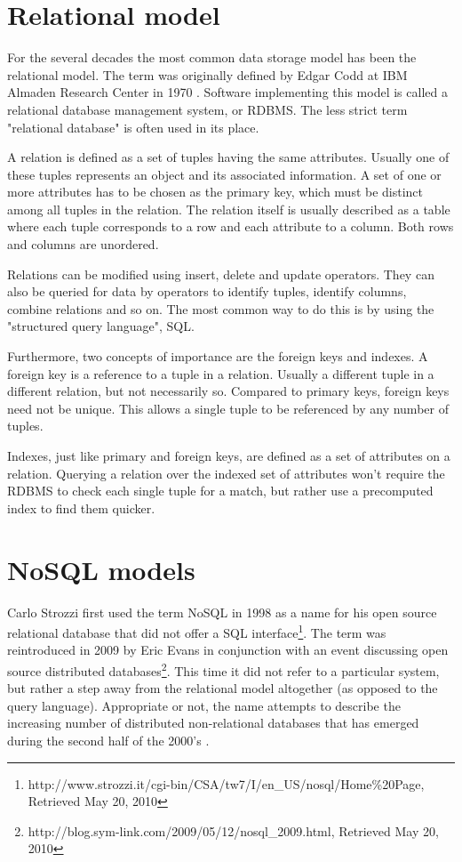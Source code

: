 \section{Relational model} \label{subsec:Relational models}

For the several decades the most common data storage model has been the relational model. The term was originally defined by Edgar Codd at IBM Almaden Research Center in 1970 \cite{Codd}. Software implementing this model is called a relational database management system, or RDBMS. The less strict term "relational database" is often used in its place.

A relation is defined as a set of tuples having the same attributes. Usually one of these tuples represents an object and its associated information. A set of one or more attributes has to be chosen as the primary key, which must be distinct among all tuples in the relation. The relation itself is usually described as a table where each tuple corresponds to a row and each attribute to a column. Both rows and columns are unordered. 

Relations can be modified using insert, delete and update operators. They can also be queried for data by operators to identify tuples, identify columns, combine relations and so on. The most common way to do this is by using the "structured query language", SQL.

Furthermore, two concepts of importance are the foreign keys and indexes. A foreign key is a reference to a tuple in a relation. Usually a different tuple in a different relation, but not necessarily so. Compared to primary keys, foreign keys need not be unique. This allows a single tuple to be referenced by any number of tuples.

Indexes, just like primary and foreign keys, are defined as a set of attributes on a relation. Querying a relation over the indexed set of attributes won't require the RDBMS to check each single tuple for a match, but rather use a precomputed index to find them quicker.

\section{NoSQL models}
Carlo Strozzi first used the term NoSQL in 1998 as a name for his open source relational database that did not offer a SQL interface\footnote{http://www.strozzi.it/cgi-bin/CSA/tw7/I/en\_US/nosql/Home\%20Page, Retrieved May 20, 2010}. The term was reintroduced in 2009 by Eric Evans in conjunction with an event discussing open source distributed databases\footnote{http://blog.sym-link.com/2009/05/12/nosql\_2009.html, Retrieved May 20, 2010}. This time it did not refer to a particular system, but rather a step away from the relational model altogether (as opposed to the query language). Appropriate or not, the name attempts to describe the increasing number of distributed non-relational databases that has emerged during the second half of the 2000's \cite{BigTable}\cite{Cassandra}.


